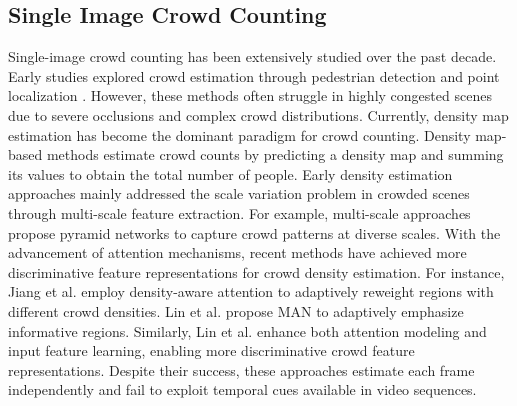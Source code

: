 \documentclass[lettersize,journal]{IEEEtran}
\begin{document}
\subsection{Single Image Crowd Counting}
Single-image crowd counting has been extensively studied over the past decade. Early studies explored crowd estimation through pedestrian detection \cite{ge2009marked,dollar2011pedestrian} and point localization \cite{song2021rethinking,liang2022focal,liu2023point,chen2024improving}. However, these methods often struggle in highly congested scenes due to severe occlusions and complex crowd distributions. Currently, density map estimation has become the dominant paradigm for crowd counting. Density map-based methods \cite{sindagi2017generating, chen2019scale,yang2020embedding,jiang2020attention,yan2021towards,liu2022lw,lin2022boosting,lin2024gramformer} estimate crowd counts by predicting a density map and summing its values to obtain the total number of people. Early density estimation approaches mainly addressed the scale variation problem in crowded scenes through multi-scale feature extraction. For example, multi-scale approaches \cite{sindagi2017generating, chen2019scale} propose pyramid networks to capture crowd patterns at diverse scales. With the advancement of attention mechanisms, recent methods have achieved more discriminative feature representations for crowd density estimation. For instance, Jiang et al.\cite{jiang2020attention} employ density-aware attention to adaptively reweight regions with different crowd densities. Lin et al.\cite{lin2022boosting} propose MAN to adaptively emphasize informative regions. Similarly, Lin et al.\cite{lin2024gramformer} enhance both attention modeling and input feature learning, enabling more discriminative crowd feature representations. Despite their success, these approaches estimate each frame independently and fail to exploit temporal cues available in video sequences.
\end{document}
